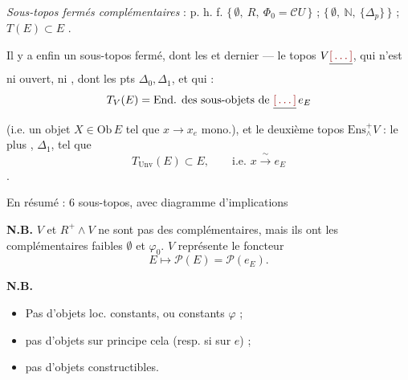 \documentclass[11pt,a4paper]{article}
\begin{document}
\emph{Sous-topos fermés complémentaires} : p. h. f.
$\{\, \emptyset,\ R,\ \Phi_{0} = \mathcal{C}U \,\}$ ;
$\{\, \emptyset,\ \mathbb{N},\ \{\Delta_{p}\} \,\}$ ;
$T(E) \subset E$ .

Il y a enfin un sous-topos fermé,  dont les \ill{} et
dernier — le topos $V\struck{\ill{}}$, qui n'est ni ouvert, ni \ill{}, dont les
pts \ill{} $\Delta_{0}, \Delta_{1}$, et qui \struck{\ill{}} :
\[
  T_{V}(E) = \text{End. des sous-objets de } \struck{\ill{}}\, e_{E}
\]
(i.e. un objet $X \in \mathrm{Ob}\,E$ tel que $x \to x_{e}$ mono.), et le
deuxième topos $\mathrm{Ens}^{+}_{\wedge} V$ \struck{\ill{}} : le plus \ill{},
 \ill{} $\Delta_{1}$, tel que
\[
  T_{\mathrm{Unv}}(E) \subset E, \qquad \text{i.e. } x \xrightarrow{\ \sim\ } e_{E}
\]
.

En résumé \ill{} : $6$ sous-topos, avec diagramme d'implications



\textbf{N.B.}\quad \struck{\ill{}} $V$ et $R^{+} \wedge V$ ne sont pas des
complémentaires, mais ils ont les complémentaires faibles $\emptyset$ et
$\varphi_{0}$. $V$  \ill{} représente le foncteur
\[
  E \longmapsto \mathcal{P}(E) = \mathcal{P}(e_{E}) .
\]

\textbf{N.B.}\quad

\begin{itemize}
  \item Pas d'objets loc. constants, ou constants  \ill{} $\varphi$ ;
  \item pas d'objets  \ill{}  sur principe
    cela \struck{\ill{}} (resp. si sur $e$) ;
  \item pas d'objets constructibles.
\end{itemize}
\end{document}
